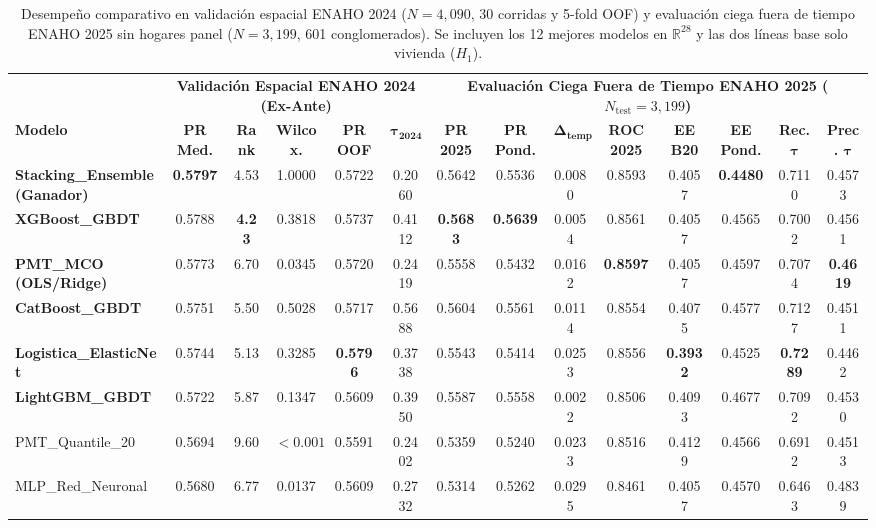 \begin{table}[!t]
\centering
\caption{Desempeño comparativo en validación espacial ENAHO 2024 ($N=4{,}090$, 30 corridas y 5-fold OOF) y evaluación ciega fuera de tiempo ENAHO 2025 sin hogares panel ($N=3{,}199$, 601 conglomerados). Se incluyen los 12 mejores modelos en $\mathbb{R}^{28}$ y las dos líneas base solo vivienda ($H_1$).}
\label{tab:resultados_2024_2025}
\fontsize{6.4}{7.8}\selectfont
\setlength{\tabcolsep}{2.4pt}
\begin{tabular}{lccccccccccccc}
\toprule
& \multicolumn{5}{c}{\textbf{Validación Espacial ENAHO 2024 (Ex-Ante)}} & \multicolumn{8}{c}{\textbf{Evaluación Ciega Fuera de Tiempo ENAHO 2025 ($N_{\text{test}}=3{,}199$)}} \\
\cmidrule(lr){2-6}\cmidrule(lr){7-14}
\textbf{Modelo} & \textbf{PR Med.} & \textbf{Rank} & \textbf{Wilcox.} & \textbf{PR OOF} & $\boldsymbol{\tau_{2024}}$ & \textbf{PR 2025} & \textbf{PR Pond.} & $\boldsymbol{\Delta_{\text{temp}}}$ & \textbf{ROC 2025} & \textbf{EE B20} & \textbf{EE Pond.} & \textbf{Rec. $\boldsymbol{\tau}$} & \textbf{Prec. $\boldsymbol{\tau}$} \\
\midrule
\textbf{Stacking\_Ensemble (Ganador)} & \textbf{0.5797} & 4.53 & 1.0000 & 0.5722 & 0.2060 & 0.5642 & 0.5536 & 0.0080 & 0.8593 & 0.4057 & \textbf{0.4480} & 0.7110 & 0.4573 \\
\textbf{XGBoost\_GBDT} & 0.5788 & \textbf{4.23} & 0.3818 & 0.5737 & 0.4112 & \textbf{0.5683} & \textbf{0.5639} & 0.0054 & 0.8561 & 0.4057 & 0.4565 & 0.7002 & 0.4561 \\
\textbf{PMT\_MCO (OLS/Ridge)} & 0.5773 & 6.70 & 0.0345 & 0.5720 & 0.2419 & 0.5558 & 0.5432 & 0.0162 & \textbf{0.8597} & 0.4057 & 0.4597 & 0.7074 & \textbf{0.4619} \\
\textbf{CatBoost\_GBDT} & 0.5751 & 5.50 & 0.5028 & 0.5717 & 0.5688 & 0.5604 & 0.5561 & 0.0114 & 0.8554 & 0.4075 & 0.4577 & 0.7127 & 0.4511 \\
\textbf{Logistica\_ElasticNet} & 0.5744 & 5.13 & 0.3285 & \textbf{0.5796} & 0.3738 & 0.5543 & 0.5414 & 0.0253 & 0.8556 & \textbf{0.3932} & 0.4525 & \textbf{0.7289} & 0.4462 \\
\textbf{LightGBM\_GBDT} & 0.5722 & 5.87 & 0.1347 & 0.5609 & 0.3950 & 0.5587 & 0.5558 & 0.0022 & 0.8506 & 0.4093 & 0.4677 & 0.7092 & 0.4530 \\
PMT\_Quantile\_20 & 0.5694 & 9.60 & $<0.001$ & 0.5591 & 0.2402 & 0.5359 & 0.5240 & 0.0233 & 0.8516 & 0.4129 & 0.4566 & 0.6912 & 0.4513 \\
MLP\_Red\_Neuronal & 0.5680 & 6.77 & 0.0137 & 0.5609 & 0.2732 & 0.5314 & 0.5262 & 0.0295 & 0.8461 & 0.4057 & 0.4570 & 0.6463 & 0.4839 \\

\end{tabular}
\end{table}
